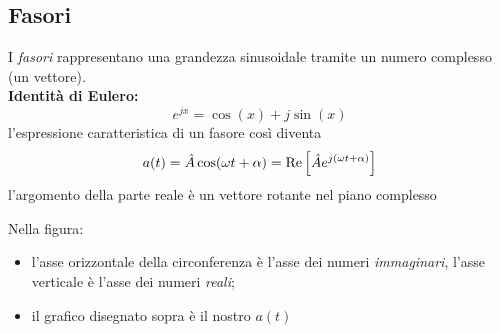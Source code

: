 \documentclass{article}
\begin{document}
\subsection{Fasori}
I \textit{fasori} rappresentano una grandezza sinusoidale tramite un numero complesso (un vettore).
\vspace*{0.1cm}\\
\textbf{Identità di Eulero:}
\[
    e^{jx} = \cos(x) + j\sin(x)
\]
l'espressione caratteristica di un fasore così diventa
\[
    a(t)=\hat A \cos(\omega t + \alpha) = \text{Re}\left[\hat A e^{j(\omega t + \alpha)}\right]
\]
l'argomento della parte reale è un vettore rotante nel piano complesso
\begin{center}
\end{center}
Nella figura:
\begin{itemize}
    \item l'asse orizzontale della circonferenza è l'asse dei numeri \textit{immaginari}, l'asse verticale è l'asse dei numeri \textit{reali};
    \item il grafico disegnato sopra è il nostro $a(t)$
\end{itemize}
\end{document}
